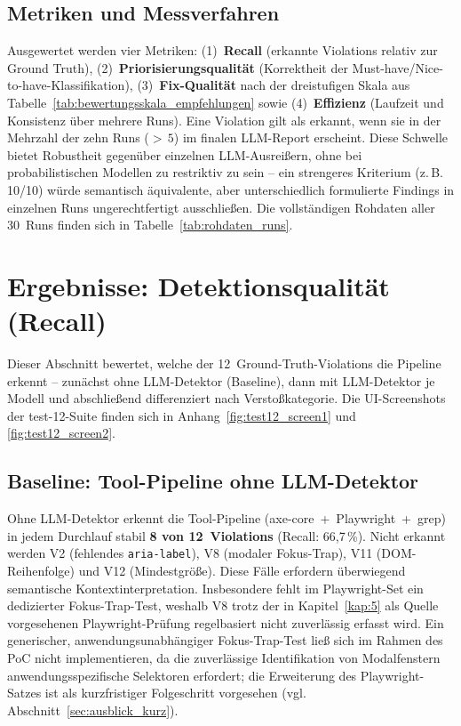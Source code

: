 \subsection{Metriken und Messverfahren}
\label{sec:versuch_metriken}

Ausgewertet werden vier Metriken: (1)~\textbf{Recall} (erkannte Violations relativ zur Ground Truth), (2)~\textbf{Priorisierungsqualität} (Korrektheit der Must-have/Nice-to-have-Klassifikation), (3)~\textbf{Fix-Qualität} nach der dreistufigen Skala aus Tabelle~\ref{tab:bewertungsskala_empfehlungen} sowie (4)~\textbf{Effizienz} (Laufzeit und Konsistenz über mehrere Runs). Eine Violation gilt als erkannt, wenn sie in der Mehrzahl der zehn Runs ($>\,5$) im finalen \ac{LLM}-Report erscheint. Diese Schwelle bietet Robustheit gegenüber einzelnen \ac{LLM}-Ausreißern, ohne bei probabilistischen Modellen zu restriktiv zu sein -- ein strengeres Kriterium (z.\,B. 10/10) würde semantisch äquivalente, aber unterschiedlich formulierte Findings in einzelnen Runs ungerechtfertigt ausschließen. Die vollständigen Rohdaten aller 30~Runs finden sich in Tabelle~\ref{tab:rohdaten_runs}.

\section{Ergebnisse: Detektionsqualität (Recall)}
\label{sec:ergebnisse_recall}

Dieser Abschnitt bewertet, welche der 12~Ground-Truth-Violations die Pipeline erkennt -- zunächst ohne \ac{LLM}-Detektor (Baseline), dann mit \ac{LLM}-Detektor je Modell und abschließend differenziert nach Verstoßkategorie. Die \acs{UI}-Screenshots der test-12-Suite finden sich in Anhang~\ref{fig:test12_screen1} und \ref{fig:test12_screen2}.

\subsection{Baseline: Tool-Pipeline ohne \ac{LLM}-Detektor}
\label{sec:recall_baseline}

Ohne \ac{LLM}-Detektor erkennt die Tool-Pipeline (axe-core~+~Playwright~+~grep) in jedem Durchlauf stabil \textbf{8 von 12~Violations} (Recall: 66,7\,\%). Nicht erkannt werden V2 (fehlendes \texttt{aria-label}), V8 (modaler Fokus-Trap), V11 (\ac{DOM}-Reihenfolge) und V12 (Mindestgröße). Diese Fälle erfordern überwiegend semantische Kontextinterpretation. Insbesondere fehlt im Playwright-Set ein dedizierter Fokus-Trap-Test, weshalb V8 trotz der in Kapitel~\ref{kap:5} als Quelle vorgesehenen Playwright-Prüfung regelbasiert nicht zuverlässig erfasst wird. Ein generischer, anwendungsunabhängiger Fokus-Trap-Test ließ sich im Rahmen des \ac{PoC} nicht implementieren, da die zuverlässige Identifikation von Modalfenstern anwendungsspezifische Selektoren erfordert; die Erweiterung des Playwright-Satzes ist als kurzfristiger Folgeschritt vorgesehen (vgl. Abschnitt~\ref{sec:ausblick_kurz}).

